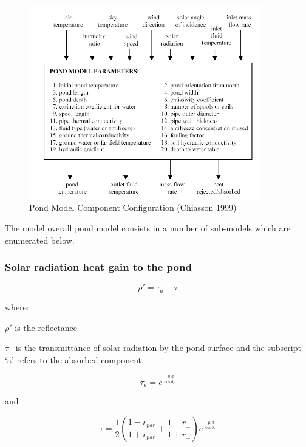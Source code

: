 \begin{figure}[hbtp] %
\centering
\includegraphics[width=0.9\textwidth, height=0.9\textheight, keepaspectratio=true]{media/image5686.png}
\caption{Pond Model Component Configuration (Chiasson 1999) \protect \label{fig:pond-model-component-configuration-chiasson}}
\end{figure}

The model overall pond model consists in a number of sub-models which are enumerated below.

\subsubsection{Solar radiation heat gain to the pond}\label{solar-radiation-heat-gain-to-the-pond}

\begin{equation}
\rho ' = {\tau_a} - \tau
\end{equation}

where:

\(\rho '\) is the reflectance

\(\tau\) ~is the transmittance of solar radiation by the pond surface and the subscript `a' refers to the absorbed component.

\begin{equation}
{\tau_a} = {e^{\frac{{ - \mu 'd}}{{\cos {\theta_r}}}}}
\end{equation}

and

\begin{equation}
\tau  = \frac{1}{2}\left( {\frac{{1 - {r_{par}}}}{{1 + {r_{par}}}} + \frac{{1 - {r_ \bot }}}{{1 + {r_ \bot }}}} \right){e^{\frac{{ - \mu 'd}}{{\cos {\theta_r}}}}}
\end{equation}

